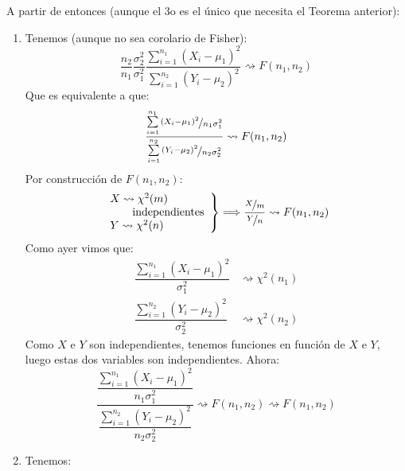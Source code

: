 \begin{coro}
    A partir de entonces (aunque el 3o es el único que necesita el Teorema anterior):
    \begin{enumerate}
        \item Tenemos (aunque no sea corolario de Fisher):
            \begin{equation*}
                \dfrac{n_2}{n_1}\dfrac{\sigma_2^2}{\sigma_1^2} \dfrac{\sum\limits_{i=1}^{n_1}{(X_i-\mu_1)}^{2}}{\sum\limits_{i=1}^{n_2}{(Y_i - \mu_2)}^{2}} \rightsquigarrow F(n_1, n_2)
            \end{equation*}
            Que es equivalente a que:
            \begin{equation*}
                \dfrac{\nicefrac{\sum\limits_{i=1}^{n_1}{(X_i-\mu_1)}^{2}}{n_1\sigma_1^2}}{\nicefrac{\sum\limits_{i=1}^{n_2}{(Y_i - \mu_2)}^{2}}{n_2\sigma_2^2}} \rightsquigarrow F(n_1,n_2)
            \end{equation*}
            Por construcción de $F(n_1,n_2)$:
            \begin{equation*}
                \left.\begin{array}{l}
                    X\rightsquigarrow \chi^2(m) \\
                    \qquad \text{independientes}\\
                    Y\rightsquigarrow\chi^2(n)
                \end{array}\right\} \Longrightarrow \dfrac{\nicefrac{X}{m}}{\nicefrac{Y}{n}} \rightsquigarrow F(n_1,n_2)
            \end{equation*}
            Como ayer vimos que:
            \begin{align*}
                \dfrac{\sum\limits_{i=1}^{n_1}{(X_i - \mu_1)}^{2}}{\sigma_1^2} &\rightsquigarrow \chi^2(n_1) \\
                \dfrac{\sum\limits_{i=1}^{n_2}{(Y_i - \mu_2)}^{2}}{\sigma_2^2} &\rightsquigarrow \chi^2(n_2) 
            \end{align*}
            Como $X$ e $Y$ son independientes, tenemos funciones en función de $X$ e $Y$, luego estas dos variables son independientes. Ahora:
            \begin{equation*}
                \dfrac{\dfrac{\sum\limits_{i=1}^{n_1}{(X_i-\mu_1)}^{2}}{n_1\sigma_1^2}}{\dfrac{\sum\limits_{i=1}^{n_2}{(Y_i - \mu_2)}^{2}}{n_2\sigma_2^2}} \rightsquigarrow F(n_1,n_2) \rightsquigarrow F(n_1,n_2)
            \end{equation*}
        \item Tenemos:

\end{enumerate}
\end{coro}

